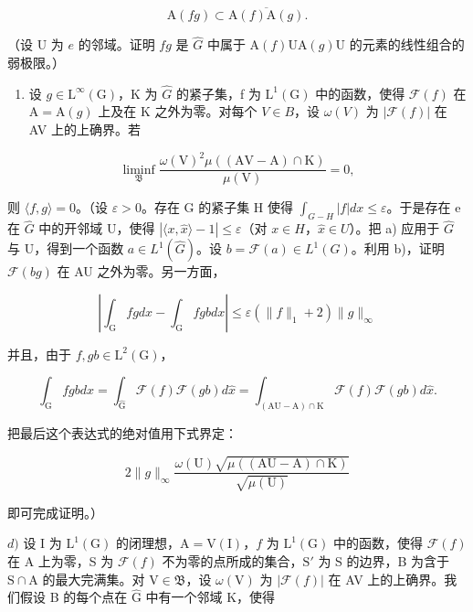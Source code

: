 \[
\mathrm{A} (f g) \subset \overline {{\mathrm{A} (f) \mathrm{A} (g)}}.
\]

（设 U 为 \(e\) 的邻域。证明 \(fg\) 是 \(\widehat{G}\) 中属于 \(\mathrm{A}(f)\mathrm{UA}(g)\mathrm{U}\) 的元素的线性组合的弱极限。）

\begin{enumerate}
\def\labelenumi{\alph{enumi})}
\setcounter{enumi}{2}
\tightlist
\item
  设 \(g \in \mathrm{L}^{\infty}(\mathrm{G})\)，K 为 \(\widehat{G}\) 的紧子集，f 为 \(\mathrm{L}^{1}(\mathrm{G})\) 中的函数，使得 \(\mathcal{F}(f)\) 在 \(\mathrm{A} = \mathrm{A}(g)\) 上及在 K 之外为零。对每个 \(V \in B\)，设 \(\omega(V)\) 为 \(|\mathcal{F}(f)|\) 在 AV 上的上确界。若
\end{enumerate}

\[
\operatorname * {l i m i n f} _ {\mathfrak {B}} \frac {\omega (\mathrm{V}) ^ {2} \mu ((\mathrm{AV} - \mathrm{A}) \cap \mathrm{K})}{\mu (\mathrm{V})} = 0,
\]

则 \(\langle f,g\rangle=0\)。（设 \(\varepsilon>0\)。存在 G 的紧子集 H 使得 \(\int_{G-H}|f|dx\leqslant\varepsilon\)。于是存在 e 在 \(\widehat{G}\) 中的开邻域 U，使得 \(|\langle x,\widehat{x}\rangle-1|\leqslant\varepsilon\)（对 \(x\in H\)，\(\widehat{x}\in U\)）。把 a) 应用于 \(\widehat{G}\) 与 U，得到一个函数 \(a\in L^{1}(\widehat{G})\)。设 \(b=\mathcal{F}(a)\in L^{1}(G)\)。利用 b)，证明 \(\mathcal{F}(bg)\) 在 AU 之外为零。另一方面，

\[
\left| \int_ {\mathrm{G}} f g d x - \int_ {\mathrm{G}} f g b d x \right| \leqslant \varepsilon (\| f \| _ {1} + 2) \| g \| _ {\infty}
\]

并且，由于 \(f, gb \in \mathrm{L}^{2}(\mathrm{G})\)，

\[
\int_ {\mathrm{G}} f g b d x = \int_ {\widehat {\mathrm{G}}} \mathcal {F} (f) \mathcal {F} (g b) d \widehat {x} = \int_ {(\mathrm{AU-A}) \cap \mathrm{K}} \mathcal {F} (f) \mathcal {F} (g b) d \widehat {x}.
\]

把最后这个表达式的绝对值用下式界定：

\[
2 \| g \| _ {\infty} \frac {\omega (\mathrm{U}) \sqrt {\mu ((\mathrm{AU} - \mathrm{A}) \cap \mathrm{K})}}{\sqrt {\mu (\mathrm{U})}}
\]

即可完成证明。）

\(d)\) 设 I 为 \(\mathrm{L}^1 (\mathrm{G})\) 的闭理想，\(\mathrm{A} = \mathrm{V}(\mathrm{I})\)，\(f\) 为 \(\mathrm{L}^1 (\mathrm{G})\) 中的函数，使得 \(\mathcal{F}(f)\) 在 A 上为零，S 为 \(\mathcal{F}(f)\) 不为零的点所成的集合，\(\mathrm{S}'\) 为 S 的边界，B 为含于 \(\mathrm{S} \cap \mathrm{A}\) 的最大完满集。对 \(\mathrm{V} \in \mathfrak{B}\)，设 \(\omega (\mathrm{V})\) 为 \(|\mathcal{F}(f)|\) 在 AV 上的上确界。我们假设 B 的每个点在 \(\widehat{\mathrm{G}}\) 中有一个邻域 K，使得

